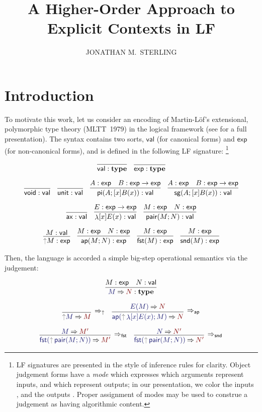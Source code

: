 \documentclass[acmtoplas]{acmtrans2m}
\title{A Higher-Order Approach to Explicit Contexts in LF}
\author{JONATHAN M.\ STERLING}
\def\InputModeColorName{MidnightBlue}
\def\OutputModeColorName{Maroon}
\newcommand\InputMode[1]{{\color{\InputModeColorName}{#1}}}
\newcommand\OutputMode[1]{{\color{\OutputModeColorName}{#1}}}
\newcommand\type{\mathbf{type}}
\newcommand\tyvoid{\mathsf{void}}
\newcommand\tyunit{\mathsf{unit}}
\newcommand\ax{\mathsf{ax}}
\newcommand\ap{\mathsf{ap}}
\newcommand\sortval{\mathsf{val}}
\newcommand\sortexp{\mathsf{exp}}
\newcommand\eval[2]{\InputMode{#1}\mathbin{\Rightarrow}\OutputMode{#2}}
\newcommand\thunk[1]{{\color{Gray}\uparrow}#1}
\newcommand\evalrule[1]{\Rightarrow_{#1}}
\DeclareMathOperator{\typi}{\mathsf{pi}}
\DeclareMathOperator{\tysg}{\mathsf{sg}}
\DeclareMathOperator{\lam}{\mathsf{\lambda}}
\DeclareMathOperator{\pair}{\mathsf{pair}}
\DeclareMathOperator{\fst}{\mathsf{fst}}
\DeclareMathOperator{\snd}{\mathsf{snd}}
\begin{document}
\maketitle

\section{Introduction}

To motivate this work, let us consider an encoding of Martin-L\"of's
extensional, polymorphic type theory (MLTT~1979) in the logical framework (see
\cite{Martin-Lof-1979} for a full presentation). The syntax contains two sorts,
$\sortval$ (for canonical forms) and $\sortexp$ (for non-canonical forms), and
is defined in the following LF signature: \footnote{LF signatures are presented
  in the style of inference rules for clarity. Object judgement forms have a
  \emph{mode} which expresses which arguments represent inputs, and which
  represent outputs; in our presentation, we color the inputs
  \emph{\InputMode\InputModeColorName}, and the outputs
  \emph{\OutputMode\OutputModeColorName}. Proper assignment of modes may be
used to construe a judgement as having algorithmic content.}

\begin{gather*}
  \infer{\sortval:\type}{}
  \quad
  \infer{\sortexp:\type}{}\\[6pt]
  \infer{\tyvoid:\sortval}{}
  \quad
  \infer{\tyunit:\sortval}{}
  \quad
  \infer{
    \typi(A;[x]B(x)):\sortval
  }{
    A:\sortexp &
    B:\sortexp\to\sortexp
  }
  \quad
  \infer{
    \tysg(A;[x]B(x)):\sortval
  }{
    A:\sortexp &
    B:\sortexp\to\sortexp
  }\\[6pt]
  \infer{\ax:\sortval}{}
  \quad
  \infer{
    \lam[x]E(x):\sortval
  }{
    E:\sortexp\to\sortexp
  }
  \quad
  \infer{
    \pair(M;N):\sortval
  }{
    M:\sortexp &
    N:\sortexp
  } \\[6pt]
  \infer{
    \thunk{M}:\sortexp
  }{
    M:\sortval
  }
  \quad
  \infer{
    \ap(M;N):\sortexp
  }{
    M:\sortexp &
    N:\sortexp
  }
  \quad
  \infer{
    \fst(M):\sortexp
  }{
    M:\sortexp
  }
  \quad
  \infer{
    \snd(M):\sortexp
  }{
    M:\sortexp
  }
\end{gather*}


Then, the language is accorded a simple big-step operational semantics via the
\framebox{$\eval{M}{N}$} judgement:

\begin{gather*}
  \infer{
    \eval{M}{N}:\type
  }{
    M:\sortexp &
    N:\sortval
  }\\[6pt]
  \infer[\evalrule\uparrow]{
    \eval{\thunk{M}}{M}
  }{
  }
  \quad
  \infer[\evalrule\ap]{
    \eval{\ap(\thunk{\lam[x]E(x)};M)}{N}
  }{
    \eval{E(M)}{N}
  }\\[6pt]
  \infer[\evalrule\fst]{
    \eval{\fst(\thunk{\pair(M;N)})}{M'}
  }{
    \eval{M}{M'}
  }
  \quad
  \infer[\evalrule\snd]{
    \eval{\fst(\thunk{\pair(M;N)})}{N'}
  }{
    \eval{N}{N'}
  }
\end{gather*}
\end{document}
